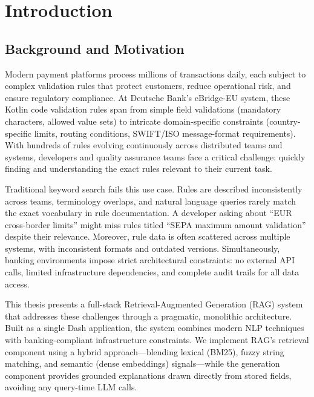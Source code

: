 \chapter{Introduction}
\label{ch:introduction}

\section{Background and Motivation}
Modern payment platforms process millions of transactions daily, each subject to complex validation rules that protect customers, reduce operational risk, and ensure regulatory compliance. At Deutsche Bank's eBridge-EU system, these Kotlin code validation rules span from simple field validations (mandatory characters, allowed value sets) to intricate domain-specific constraints (country-specific limits, routing conditions, SWIFT/ISO message-format requirements). With hundreds of rules evolving continuously across distributed teams and systems, developers and quality assurance teams face a critical challenge: quickly finding and understanding the exact rules relevant to their current task.

Traditional keyword search fails this use case. Rules are described inconsistently across teams, terminology overlaps, and natural language queries rarely match the exact vocabulary in rule documentation. A developer asking about ``EUR cross-border limits'' might miss rules titled ``SEPA maximum amount validation'' despite their relevance. Moreover, rule data is often scattered across multiple systems, with inconsistent formats and outdated versions. Simultaneously, banking environments impose strict architectural constraints: no external API calls, limited infrastructure dependencies, and complete audit trails for all data access.

This thesis presents a full-stack Retrieval-Augmented Generation (RAG) system that addresses these challenges through a pragmatic, monolithic architecture. Built as a single Dash application, the system combines modern NLP techniques with banking-compliant infrastructure constraints. We implement RAG's retrieval component using a hybrid approach—blending lexical (BM25), fuzzy string matching, and semantic (dense embeddings) signals—while the generation component provides grounded explanations drawn directly from stored fields, avoiding any query-time LLM calls.

